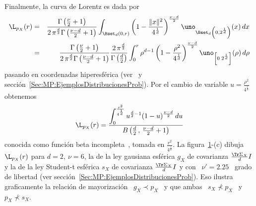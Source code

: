 {\begin{ejemplo}
 Finalmente, la curva de Lorentz es dada por
  \begin{eqnarray*}
  \L_{p_X}(r) & = & \frac{\Gamma\left( \frac{\nu}{2} + 1 \right)}{2 \,
  \pi^{\frac{d}{2}} \Gamma\left( \frac{\nu-d}{2} + 1 \right)} \int_{\Bset_d(0,r)}
  \left( 1 - \frac{\|x\|^2}{4^{\frac1d}} \right)^{\frac{\nu-d}{2}}
  \uno_{\Bset_d\left(0 , 2^{\frac1d} \right)}(x) \, dx\\
  & = & \frac{\Gamma\left( \frac{\nu}{2} + 1 \right)}{2 \, \pi^{\frac{d}{2}}
  \Gamma\left( \frac{\nu-d}{2} + 1 \right)} \frac{2 \,
  \pi^{\frac{d}{2}}}{\Gamma\left( \frac{d}{2} \right)} \int_0^r \rho^{d-1} \left( 1 -
  \frac{\rho^2}{4^{\frac1d}} \right)^{\frac{\nu-d}{2}} \uno_{\left[ 0 \; 2^{\frac1d}
  \right]}(\rho) \, d\rho
  \end{eqnarray*}
  pasando en coordenadas hiperesf\'erica (ver~\cite{Lor54, FanKot90, CamHua81} y
  secci\'on~\ref{Sec:MP:EjemplosDistribucionesProb}). Por  el cambio de variable
  $u = \frac{\rho^2}{4^{\frac1d}}$ obtenemos
  \[
  \L_{p_X}(r)     =     \frac{\displaystyle     \int_0^{\frac{r^2}{4^{\frac1d}}}
    u^{\frac{d}{2}-1} (1-u)^{\frac{\nu-d}{2}} \, du}{B\left( \frac{d}{2} \, , \,
      \frac{\nu-d}{2} + 1 \right)}
  \]
  conocida como funci\'on  beta incompleta~\cite[Ec.~8.392]{GraRyz15}, tomada en
  $\frac{r^2}{4^{\frac1d}}$.                                                   La
  figura~\ref{Fig:MP:RearregloMayorizacionEjemplo}-(c) dibuja $\L_{p_X}(r)$ para
  $d =  2, \: \nu  = 6$, la  de la ley  gausiana esf\'erica $g_X$  de covarianza
  $\frac{\Tr  \Sigma_X}{d} I$  y  la de  la  ley Student-t  esf\'erica $s_X$  de
  covarianza  $\frac{\Tr \Sigma_X}{d}  I$  y con  \  $\nu' =  2.25$  \ grado  de
  libertad (ver  secci\'on~\ref{Sec:MP:EjemplosDistribucionesProb}). Eso ilustra
  graficamente la relaci\'on de mayorizaci\'on \ $g_X \prec p_X$ \ y que ambas \
  $s_X \not\prec p_X$ \ y \ $p_X \not\prec s_X$.

  \begin{figure}[h!]
  \begin{center}  \end{center}
  \label{Fig:MP:RearregloMayorizacionEjemplo}
  \end{figure}
\end{ejemplo}
}
